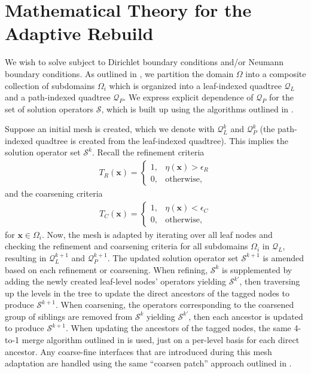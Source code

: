 \section{Mathematical Theory for the Adaptive Rebuild}

We wish to solve  subject to Dirichlet boundary conditions and/or Neumann boundary conditions. As outlined in , we partition the domain $\Omega$ into a composite collection of subdomains $\Omega_i$ which is organized into a leaf-indexed quadtree $\mathcal{Q}_{L}$ and a path-indexed quadtree $\mathcal{Q}_{P}$. We express explicit dependence of $\mathcal{Q}_{P}$ for the set of solution operators $\mathcal{S}$, which is built up using the algorithms outlined in .

Suppose an initial mesh is created, which we denote with $\mathcal{Q}^{k}_{L}$ and $\mathcal{Q}^{k}_{P}$ (the path-indexed quadtree is created from the leaf-indexed quadtree). This implies the solution operator set $\mathcal{S}^{k}$. Recall the refinement criteria
\begin{align}
    T_{R} (\textbf{x}) =
    \begin{cases}
        1,& \eta(\textbf{x}) > \epsilon_{R} \\
        0,& \text{otherwise},
    \end{cases}
\end{align}
and the coarsening criteria
\begin{align}
    T_{C} (\textbf{x}) =
    \begin{cases}
        1,& \eta(\textbf{x}) < \epsilon_{C} \\
        0,& \text{otherwise},
    \end{cases}
\end{align}
for $\textbf{x} \in \Omega_i$. Now, the mesh is adapted by iterating over all leaf nodes and checking the refinement and coarsening criteria for all subdomains $\Omega_i$ in $\mathcal{Q}_{L}$, resulting in $\mathcal{Q}^{k+1}_{L}$ and $\mathcal{Q}^{k+1}_{P}$. The updated solution operator set $\mathcal{S}^{k+1}$ is amended based on each refinement or coarsening. When refining, $\mathcal{S}^{k}$ is supplemented by adding the newly created leaf-level nodes' operators yielding $\mathcal{S}^{k'}$, then traversing up the levels in the tree to update the direct ancestors of the tagged nodes to produce $\mathcal{S}^{k+1}$. When coarsening, the operators corresponding to the coarsened group of siblings are removed from $\mathcal{S}^{k}$ yielding $\mathcal{S}^{k'}$, then each ancestor is updated to produce $\mathcal{S}^{k+1}$. When updating the ancestors of the tagged nodes, the same 4-to-1 merge algorithm outlined in  is used, just on a per-level basis for each direct ancestor. Any coarse-fine interfaces that are introduced during this mesh adaptation are handled using the same ``coarsen patch'' approach outlined in .



